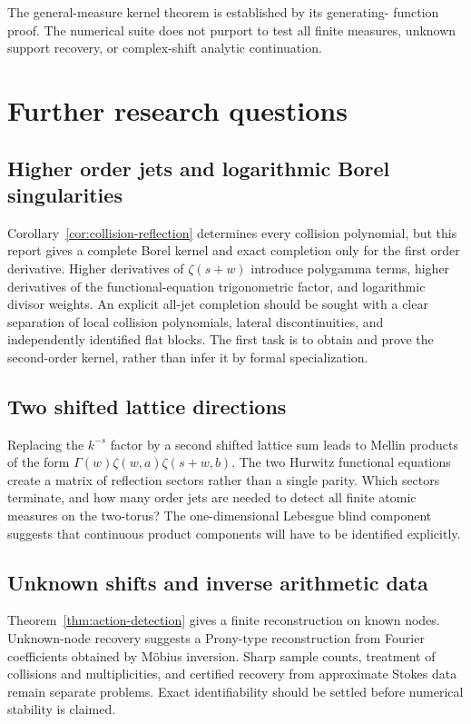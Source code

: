 \documentclass[11pt,a4paper]{article}
\numberwithin{equation}{section}
\theoremstyle{definition}\newtheorem{definition}[theorem]{Definition}
\theoremstyle{remark}\newtheorem{remark}[theorem]{Remark}
\begin{document}
The general-measure kernel theorem is established by its generating-
function proof. The numerical suite does not purport to test all finite
measures, unknown support recovery, or complex-shift analytic continuation.

\section{Further research questions}
\label{sec:future}

\subsection{Higher order jets and logarithmic Borel singularities}
Corollary~\ref{cor:collision-reflection} determines every collision
polynomial, but this report gives a complete Borel kernel and exact
completion only for the first order derivative. Higher derivatives of
$\zeta(s+w)$ introduce polygamma terms, higher derivatives of the
functional-equation trigonometric factor, and logarithmic divisor
weights. An explicit all-jet completion should be sought with a clear
separation of local collision polynomials, lateral discontinuities,
and independently identified flat blocks. The first task is to obtain
and prove the second-order kernel, rather than infer it by formal
specialization.

\subsection{Two shifted lattice directions}
Replacing the $k^{-s}$ factor by a second shifted lattice sum leads to
Mellin products of the form
$\Gamma(w)\zeta(w,a)\zeta(s+w,b)$. The two Hurwitz functional equations
create a matrix of reflection sectors rather than a single parity.
Which sectors terminate, and how many order jets are needed to detect
all finite atomic measures on the two-torus? The one-dimensional
Lebesgue blind component suggests that continuous product components
will have to be identified explicitly.

\subsection{Unknown shifts and inverse arithmetic data}
Theorem~\ref{thm:action-detection} gives a finite reconstruction on known
nodes. Unknown-node recovery suggests a Prony-type reconstruction from
Fourier coefficients obtained by M\"obius inversion. Sharp sample
counts, treatment of collisions and multiplicities, and certified
recovery from approximate Stokes data remain separate problems. Exact
identifiability should be settled before numerical stability is claimed.
\end{document}
